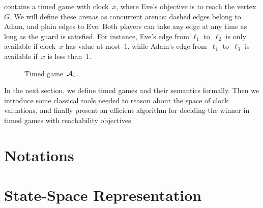 \begin{example}\label{9-ex:intro}
 contains a timed game with clock~$x$, where Eve's objective is to reach the vertex~$G$.
We will define these arenas as concurrent arenas: dashed edges belong to Adam,
and plain edges to Eve. Both players can take any edge at any time as long as
the guard is satisfied. For instance, Eve's edge from $\ell_1$ to~$\ell_2$ is only available if clock~$x$ has value at most~$1$, while Adam's edge from~$\ell_1$ to~$\ell_3$ is available if~$x$ is less than~$1$. 

\begin{figure}[ht]
  \centering
  \caption{Timed game~$\mathcal{A}_1$.}
  \label{9-fig:ta1}
\end{figure}
\end{example}

In the next section, we define timed games and their semantics formally.
Then we introduce some classical tools needed to reason
about the space of clock valuations, and finally present an efficient
algorithm for deciding the winner in timed games with reachability
objectives.

\section{Notations}
\label{9-sec:notations}


\section{State-Space Representation}
\label{9-sec:state_space_representation}


